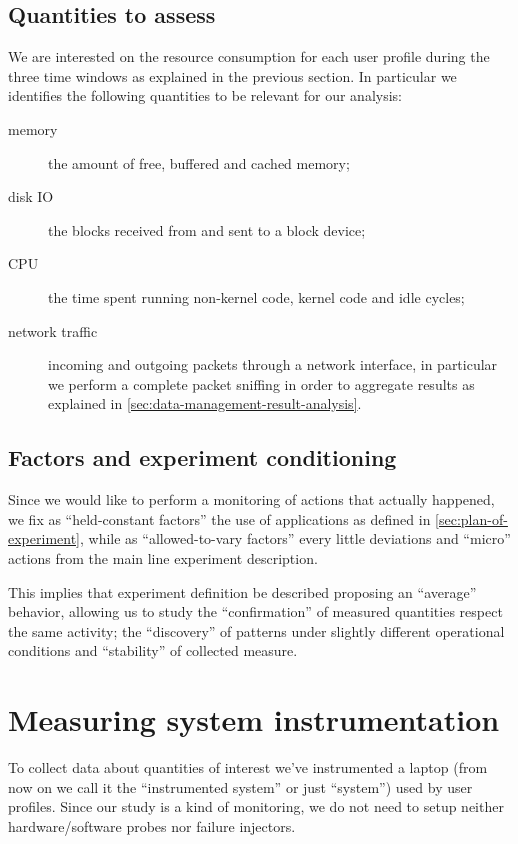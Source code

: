 \documentclass[10pt,a4paper]{article}
\begin{document}
    \subsection{Quantities to assess}
    We are interested on the resource consumption for each user
    profile during the three time windows as explained in the previous
    section. In particular we identifies the following quantities to
    be relevant for our analysis:
    \begin{description}
    \item[memory] the amount of free, buffered and cached memory;
    \item[disk IO] the blocks received from and sent to a block
      device;
    \item[CPU] the time spent running non-kernel code, kernel code and
      idle cycles;
    \item[network traffic] incoming and outgoing packets through a
      network interface, in particular we perform a complete packet
      sniffing in order to aggregate results as explained in
      \autoref{sec:data-management-result-analysis}.
    \end{description}


    \subsection{Factors and experiment conditioning}
    Since we would like to perform a monitoring of actions that
    actually happened, we fix as ``held-constant factors'' the use of
    applications as defined in \autoref{sec:plan-of-experiment}, while
    as ``allowed-to-vary factors'' every little deviations and
    ``micro'' actions from the main line experiment description. 

    This implies that experiment definition be described proposing an
    ``average'' behavior, allowing us to study the ``confirmation'' of
    measured quantities respect the same activity; the ``discovery''
    of patterns under slightly different operational conditions and
    ``stability'' of collected measure.

    \section{Measuring system instrumentation}
    To collect data about quantities of interest we've instrumented a
    laptop (from now on we call it the ``instrumented system'' or just
    ``system'') used by user profiles. Since our study is a kind of
    monitoring, we do not need to setup neither hardware/software
    probes nor failure injectors.
\end{document}
